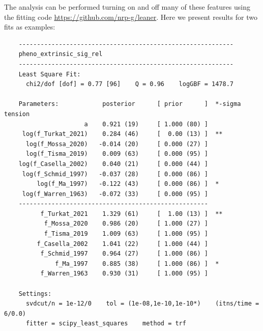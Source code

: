 \documentclass[prd,10pt,superscriptaddress,notitlepage,tightenlines,nofootinbib,floatfix]{revtex4-1}
\begin{document}
The analysis can be performed turning on and off many of these features using the fitting code \url{https://github.com/nrp-g/leaner}.
Here we present results for two fits as examples:
\begin{verbatim}
    -----------------------------------------------------------
    pheno_extrinsic_sig_rel
    -----------------------------------------------------------
    Least Square Fit:
      chi2/dof [dof] = 0.77 [96]    Q = 0.96    logGBF = 1478.7
    
    Parameters:            posterior      [ prior      ]  *-sigma tension
                      a    0.921 (19)     [ 1.000 (80) ]
     log(f_Turkat_2021)    0.284 (46)     [  0.00 (13) ]  **
      log(f_Mossa_2020)   -0.014 (20)     [ 0.000 (27) ]
      log(f_Tisma_2019)    0.009 (63)     [ 0.000 (95) ]
    log(f_Casella_2002)    0.040 (21)     [ 0.000 (44) ]
     log(f_Schmid_1997)   -0.037 (28)     [ 0.000 (86) ]
         log(f_Ma_1997)   -0.122 (43)     [ 0.000 (86) ]  *
     log(f_Warren_1963)   -0.072 (33)     [ 0.000 (95) ]
    ----------------------------------------------------
          f_Turkat_2021    1.329 (61)     [  1.00 (13) ]  **
           f_Mossa_2020    0.986 (20)     [ 1.000 (27) ]
           f_Tisma_2019    1.009 (63)     [ 1.000 (95) ]
         f_Casella_2002    1.041 (22)     [ 1.000 (44) ]
          f_Schmid_1997    0.964 (27)     [ 1.000 (86) ]
              f_Ma_1997    0.885 (38)     [ 1.000 (86) ]  *
          f_Warren_1963    0.930 (31)     [ 1.000 (95) ]
    
    Settings:
      svdcut/n = 1e-12/0    tol = (1e-08,1e-10,1e-10*)    (itns/time = 6/0.0)
      fitter = scipy_least_squares    method = trf
    
\end{verbatim}
\end{document}
